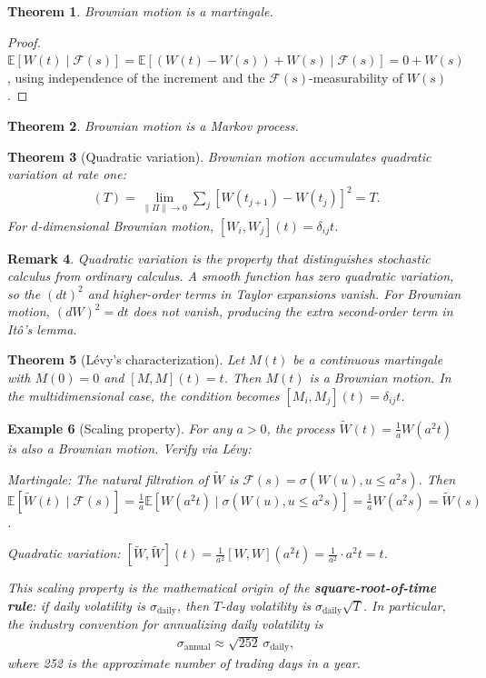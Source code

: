 \documentclass{report}
\theoremstyle{spacedplain}
\newtheorem{theorem}{Theorem}[section]
\theoremstyle{spaceddefinition}
\newtheorem{example}[theorem]{Example}
\theoremstyle{spacedremark}
\newtheorem{remark}[theorem]{Remark}
\begin{document}
\begin{theorem}
Brownian motion is a martingale.
\end{theorem}

\begin{proof}
$\mathbb{E}[W(t) \mid \mathcal{F}(s)] = \mathbb{E}[(W(t)-W(s)) + W(s) \mid \mathcal{F}(s)] = 0 + W(s)$, using independence of the increment and the $\mathcal{F}(s)$-measurability of $W(s)$.
\end{proof}

\begin{theorem}
Brownian motion is a Markov process.
\end{theorem}

\begin{theorem}[Quadratic variation]
Brownian motion accumulates quadratic variation at rate one:
\begin{align}
    [W,W](T) = \lim_{\|\Pi\| \to 0} \sum_j [W(t_{j+1}) - W(t_j)]^2 = T.
\end{align}
For $d$-dimensional Brownian motion, $[W_i, W_j](t) = \delta_{ij} t$.
\end{theorem}

\begin{remark}
Quadratic variation is the property that distinguishes stochastic calculus from ordinary calculus. A smooth function has zero quadratic variation, so the $(dt)^2$ and higher-order terms in Taylor expansions vanish. For Brownian motion, $(dW)^2 = dt$ does not vanish, producing the extra second-order term in It\^o's lemma.
\end{remark}

\begin{theorem}[L\'evy's characterization]
Let $M(t)$ be a continuous martingale with $M(0)=0$ and $[M,M](t) = t$. Then $M(t)$ is a Brownian motion. In the multidimensional case, the condition becomes $[M_i, M_j](t) = \delta_{ij} t$.
\end{theorem}


\begin{example}[Scaling property]
For any $a > 0$, the process $\widetilde{W}(t) = \frac{1}{a}W(a^2 t)$ is also a Brownian motion. Verify via L\'evy:

\emph{Martingale:} The natural filtration of $\widetilde{W}$ is $\mathcal{F}(s) = \sigma(W(u), u \leq a^2s)$. Then $\mathbb{E}[\widetilde{W}(t) \mid \mathcal{F}(s)] = \frac{1}{a}\mathbb{E}[W(a^2t) \mid \sigma(W(u), u \leq a^2s)] = \frac{1}{a}W(a^2s) = \widetilde{W}(s)$.

\emph{Quadratic variation:} $[\widetilde{W}, \widetilde{W}](t) = \frac{1}{a^2}[W,W](a^2t) = \frac{1}{a^2} \cdot a^2 t = t$.

This scaling property is the mathematical origin of the \textbf{square-root-of-time rule}: if daily volatility is $\sigma_{\text{daily}}$, then $T$-day volatility is $\sigma_{\text{daily}}\sqrt{T}$. In particular, the industry convention for annualizing daily volatility is
\begin{align}
    \sigma_{\text{annual}} \approx \sqrt{252}\, \sigma_{\text{daily}},
\end{align}
where 252 is the approximate number of trading days in a year.
\end{example}
\end{document}
